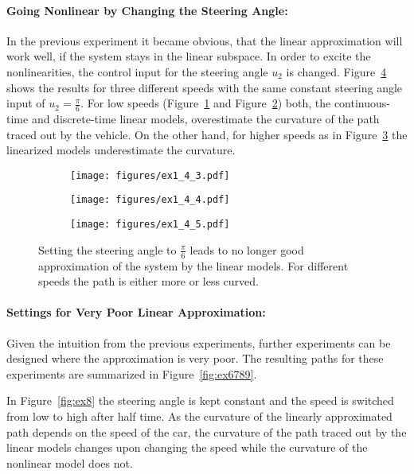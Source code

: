 \paragraph{Going Nonlinear by Changing the Steering Angle: }
In the previous experiment it became obvious, that the linear approximation will work well, if the system stays in the linear subspace.
In order to excite the nonlinearities, the control input for the steering angle $u_2$ is changed.
Figure~\ref{fig:ex345} shows the results for three different speeds with the same constant steering angle input of $u_2 = \frac{\pi}{6}$.
For low speeds (Figure~\ref{fig:ex3} and Figure~\ref{fig:ex4}) both, the continuous-time and discrete-time linear models, overestimate the curvature of the path traced out by the vehicle.
On the other hand, for higher speeds as in Figure~\ref{fig:ex5} the linearized models underestimate the curvature.

\begin{figure}[h]
	\centering
	\begin{subfigure}{0.32\textwidth}
		\texttt{[image: figures/ex1\_4\_3.pdf]}
		\label{fig:ex3}
	\end{subfigure}
	\begin{subfigure}{0.32\textwidth}
		\texttt{[image: figures/ex1\_4\_4.pdf]}
		\label{fig:ex4}
	\end{subfigure}
	\begin{subfigure}{0.32\textwidth}
		\texttt{[image: figures/ex1\_4\_5.pdf]}
		\label{fig:ex5}
	\end{subfigure}
	\caption{Setting the steering angle to $\frac{\pi}{6}$ leads to no longer good approximation of the system by the linear models. For different speeds the path is either more or less curved.}
	\label{fig:ex345}
\end{figure}

\paragraph{Settings for Very Poor Linear Approximation: }
Given the intuition from the previous experiments, further experiments can be designed where the approximation is very poor. 
The resulting paths for these experiments are summarized in Figure~\ref{fig:ex6789}.

In Figure~\ref{fig:ex8} the steering angle is kept constant and the speed is switched from low to high after half time. 
As the curvature of the linearly approximated path depends on the speed of the car, the curvature of the path traced out by the linear models changes upon changing the speed while the curvature of the nonlinear model does not.

